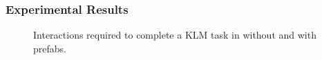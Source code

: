\documentclass[11pt]{article}
\begin{document}
		\subsubsection{Experimental Results}
			\begin{figure}
				\centering	
				\begin{subfigure}[b]{\textwidth}
					\caption{\label{fig:opendcklm1}}
				\end{subfigure}
				\vfill
				\begin{subfigure}[b]{\textwidth}
					\caption{\label{fig:opendcklm2}}
				\end{subfigure}
				\caption[Interactions required to complete a KLM task in two variants of \opendc{}]{Interactions required to complete a KLM task in \opendc{} without and with prefabs.}
				\label{fig:opendcklm}
			\end{figure}
\end{document}
